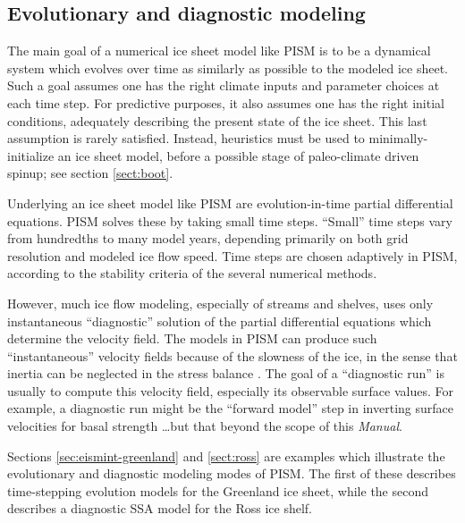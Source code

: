 \documentclass[titlepage,letterpaper,final]{scrartcl}
\begin{document}
\subsection{Evolutionary and diagnostic modeling} \label{subsect:basicmodes}    The main goal of a numerical ice sheet model like PISM is to be a dynamical system which evolves over time as similarly as possible to the modeled ice sheet.  Such a goal assumes one has the right climate inputs and parameter choices at each time step.  For predictive purposes, it also assumes one has the right initial conditions, adequately describing the present state of the ice sheet.  This last assumption is rarely satisfied.  Instead, heuristics must be used to minimally-initialize an ice sheet model, before a possible stage of paleo-climate driven spinup; see section \ref{sect:boot}.

Underlying an ice sheet model like PISM are evolution-in-time partial differential equations.  PISM solves these by taking small time steps.  ``Small'' time steps vary from hundredths to many model years, depending primarily on both grid resolution and modeled ice flow speed.  Time steps are chosen adaptively in PISM, according to the stability criteria of the several numerical methods.

However, much ice flow modeling, especially of streams and shelves, uses only instantaneous ``diagnostic'' solution of the partial differential equations which determine the velocity field.  The models in PISM can produce such ``instantaneous'' velocity fields because of the slowness of the ice, in the sense that inertia can be neglected in the stress balance \cite{Fowler}.  The goal of a ``diagnostic run'' is usually to compute this velocity field, especially its observable surface values.  For example, a diagnostic run might be the ``forward model'' step in inverting surface velocities for basal strength \dots but that beyond the scope of this \emph{Manual}.

Sections \ref{sec:eismint-greenland} and \ref{sect:ross} are examples which illustrate the evolutionary and diagnostic modeling modes of PISM.  The first of these describes time-stepping evolution models for the Greenland ice sheet, while the second describes a diagnostic SSA model for the Ross ice shelf.
\end{document}
